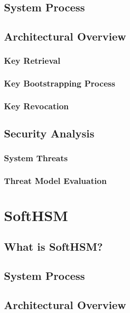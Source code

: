 		\subsection{System Process}

			\subsection{Architectural Overview}

			\subsubsection{Key Retrieval}

			\subsubsection{Key Bootstrapping Process}

			\subsubsection{Key Revocation}

		\subsection{Security Analysis}

			\subsubsection{System Threats}

			\subsubsection{Threat Model Evaluation}

	\section{SoftHSM}

		\subsection{What is SoftHSM?}

		\subsection{System Process}

			\subsection{Architectural Overview}

